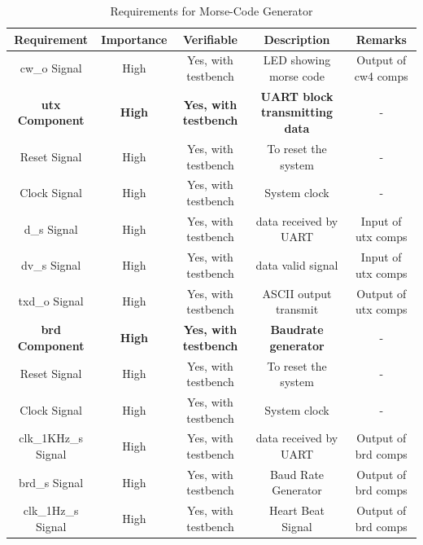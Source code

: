 \documentclass[12pt,a4paper, landscape]{article}
\begin{document}
\begin{table}[h!]
\centering
\begin{tabular}{|c||c|c|c|c|} 
 \hline
 \textbf{Requirement} & \textbf{Importance}& \textbf{Verifiable} & \textbf{Description} & \textbf{Remarks} \\ [0.5ex] 
 \hline
  \hline
  cw\_o Signal & High & Yes, with testbench & LED showing morse code & Output of cw4 comps \\ [0.5ex] 
 \hline
 \textbf{utx Component} & \textbf{High} & \textbf{Yes, with testbench} & \textbf{UART block transmitting data} & - \\[0.5ex] 
 \hline
 Reset Signal & High & Yes, with testbench & To reset the system & -\\ [0.5ex] 
 \hline
 Clock Signal & High & Yes, with testbench & System clock & - \\ [0.5ex] 
 \hline
 d\_s Signal & High & Yes, with testbench & data received by UART & Input of utx comps \\ [0.5ex] 
 \hline
 dv\_s Signal & High & Yes, with testbench & data valid signal & Input of utx comps \\ [0.5ex] 
 \hline
 txd\_o Signal & High & Yes, with testbench & ASCII output transmit & Output of utx comps \\ [0.5ex] 
 \hline
 \textbf{brd Component} & \textbf{High} & \textbf{Yes, with testbench} & \textbf{Baudrate generator} & - \\[0.5ex] 
 \hline
 Reset Signal & High & Yes, with testbench & To reset the system & -\\ [0.5ex] 
 \hline
 Clock Signal & High & Yes, with testbench & System clock & - \\ [0.5ex] 
 \hline
 clk\_1KHz\_s Signal & High & Yes, with testbench & data received by UART & Output of brd comps \\ [0.5ex] 
 \hline
 brd\_s Signal & High & Yes, with testbench & Baud Rate Generator & Output of brd comps \\ [0.5ex] 
 \hline
  clk\_1Hz\_s Signal & High & Yes, with testbench & Heart Beat Signal & Output of brd comps \\ [0.5ex] 
 \hline
  
\end{tabular}
\caption{ Requirements for Morse-Code Generator }
\label{table:1}
\end{table}
\end{document}

